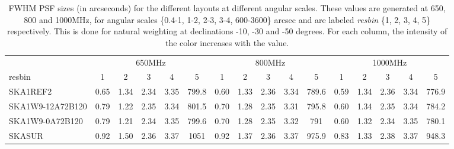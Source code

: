 \begin{table}[!htp]
{{\begin{tabular}{|lccccc||ccccc||ccccc|}
 \tabularnewline \cline{2-16} \multicolumn{1}{c}{ } & \multicolumn{5}{|c}{650MHz}  & \multicolumn{5}{c}{800MHz}  & \multicolumn{5}{c|}{1000MHz} \tabularnewline \cline{1-16} 
 resbin  &1 & 2 & 3 & 4 & 5 & 1 & 2 & 3 & 4 & 5 & 1 & 2 & 3 & 4 & 5 \tabularnewline \hline
SKA1REF2 & 0.65 \cellcolor{blue!18.00} & 1.34 \cellcolor{red!36.79} & 2.34 \cellcolor{green!18.00} & 3.35 \cellcolor{orange!33.35} & 799.8 \cellcolor{purple!18.03} & 0.60 \cellcolor{blue!18.00} & 1.33 \cellcolor{red!39.49} & 2.36 \cellcolor{green!57.35} & 3.34 \cellcolor{orange!42.20} & 789.6 \cellcolor{purple!18.00} & 0.59 \cellcolor{blue!18.00} & 1.34 \cellcolor{red!60.00} & 2.36 \cellcolor{green!37.12} & 3.34 \cellcolor{orange!18.00} & 776.9 \cellcolor{purple!18.00}\\ \hline 
SKA1W9-12A72B120 & 0.79 \cellcolor{blue!39.20} & 1.22 \cellcolor{red!19.82} & 2.35 \cellcolor{green!41.82} & 3.34 \cellcolor{orange!18.00} & 801.5 \cellcolor{purple!18.32} & 0.70 \cellcolor{blue!31.17} & 1.28 \cellcolor{red!19.28} & 2.35 \cellcolor{green!18.00} & 3.31 \cellcolor{orange!18.00} & 795.8 \cellcolor{purple!19.40} & 0.60 \cellcolor{blue!19.91} & 1.34 \cellcolor{red!51.29} & 2.35 \cellcolor{green!27.45} & 3.34 \cellcolor{orange!18.46} & 784.2 \cellcolor{purple!19.79}\\ \hline 
SKA1W9-0A72B120 & 0.79 \cellcolor{blue!39.86} & 1.21 \cellcolor{red!18.00} & 2.34 \cellcolor{green!19.23} & 3.35 \cellcolor{orange!35.72} & 799.6 \cellcolor{purple!18.00} & 0.70 \cellcolor{blue!31.38} & 1.28 \cellcolor{red!18.00} & 2.35 \cellcolor{green!31.89} & 3.32 \cellcolor{orange!21.28} & 791 \cellcolor{purple!18.32} & 0.60 \cellcolor{blue!19.52} & 1.32 \cellcolor{red!18.00} & 2.34 \cellcolor{green!18.00} & 3.35 \cellcolor{orange!35.79} & 780.1 \cellcolor{purple!18.78}\\ \hline 
SKASUR & 0.92 \cellcolor{blue!60.00} & 1.50 \cellcolor{red!60.00} & 2.36 \cellcolor{green!60.00} & 3.37 \cellcolor{orange!60.00} & 1051 \cellcolor{purple!60.00} & 0.92 \cellcolor{blue!60.00} & 1.37 \cellcolor{red!60.00} & 2.36 \cellcolor{green!60.00} & 3.37 \cellcolor{orange!60.00} & 975.9 \cellcolor{purple!60.00} & 0.83 \cellcolor{blue!60.00} & 1.33 \cellcolor{red!46.43} & 2.38 \cellcolor{green!60.00} & 3.37 \cellcolor{orange!60.00} & 948.3 \cellcolor{purple!60.00}\tabularnewline \hline 
\end{tabular}}\hfil 

\caption{FWHM PSF sizes (in arcseconds) for the different layouts at different angular scales. These values are generated at 650, 800 and 1000MHz, for angular scales \{0.4-1, 1-2, 2-3, 3-4, 600-3600\} arcsec and are labeled {\it resbin} \{1, 2, 3, 4, 5\} respectively. This is done for natural weighting at declinations -10, -30 and -50 degrees. For each column, the intensity of the color increases with the value.}\label{tab:psf_mean-band1}}
 \end{table}